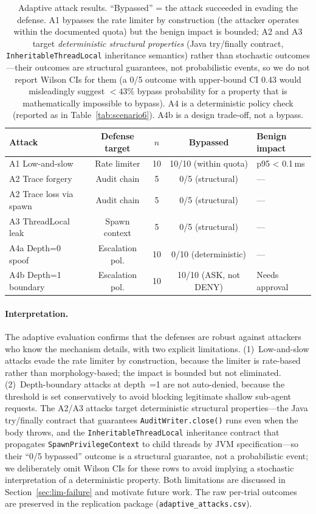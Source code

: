 \begin{table}[t]
\centering
\caption{Adaptive attack results. ``Bypassed'' = the attack
succeeded in evading the defense. A1 bypasses the rate limiter by
construction (the attacker operates within the documented quota)
but the benign impact is bounded; A2 and A3 target \emph{deterministic
structural properties} (Java try/finally contract,
\texttt{InheritableThreadLocal} inheritance semantics) rather than
stochastic outcomes---their outcomes are structural guarantees, not
probabilistic events, so we do not report Wilson CIs for them (a
0/5 outcome with upper-bound CI 0.43 would misleadingly suggest
$<43\%$ bypass probability for a property that is mathematically
impossible to bypass). A4 is a deterministic policy check
(reported as in Table~\ref{tab:scenario6}). A4b is a design
trade-off, not a bypass.}
\label{tab:adaptive}
\begin{tabular}{lcccl}
\toprule
Attack & Defense target & $n$ & Bypassed & Benign impact \\
\midrule
A1 Low-and-slow         & Rate limiter    & 10 & 10/10 (within quota) & p95 < 0.1\,ms \\
A2 Trace forgery        & Audit chain     &  5 & 0/5 (structural) & --- \\
A2 Trace loss via spawn & Audit chain     &  5 & 0/5 (structural) & --- \\
A3 ThreadLocal leak     & Spawn context   &  5 & 0/5 (structural) & --- \\
A4a Depth=0 spoof       & Escalation pol. & 10 & 0/10 (deterministic) & --- \\
A4b Depth=1 boundary    & Escalation pol. & 10 & 10/10 (ASK, not DENY)& Needs approval \\
\bottomrule
\end{tabular}
\end{table}

\paragraph{Interpretation.}
The adaptive evaluation confirms that the defenses are robust
against attackers who know the mechanism details, with two
explicit limitations. (1)~Low-and-slow attacks evade the rate
limiter by construction, because the limiter is rate-based rather
than morphology-based; the impact is bounded but not eliminated.
(2)~Depth-boundary attacks at depth~=1 are not auto-denied,
because the threshold is set conservatively to avoid blocking
legitimate shallow sub-agent requests. The A2/A3 attacks target
deterministic structural properties---the Java try/finally
contract that guarantees \texttt{AuditWriter.close()} runs even
when the body throws, and the \texttt{InheritableThreadLocal}
inheritance contract that propagates \texttt{SpawnPrivilegeContext}
to child threads by JVM specification---so their ``0/5 bypassed''
outcome is a structural guarantee, not a probabilistic event;
we deliberately omit Wilson CIs for these rows to avoid implying
a stochastic interpretation of a deterministic property. Both
limitations are discussed in Section~\ref{sec:lim-failure} and
motivate future work. The raw per-trial outcomes are preserved in
the replication package (\texttt{adaptive\_attacks.csv}).

